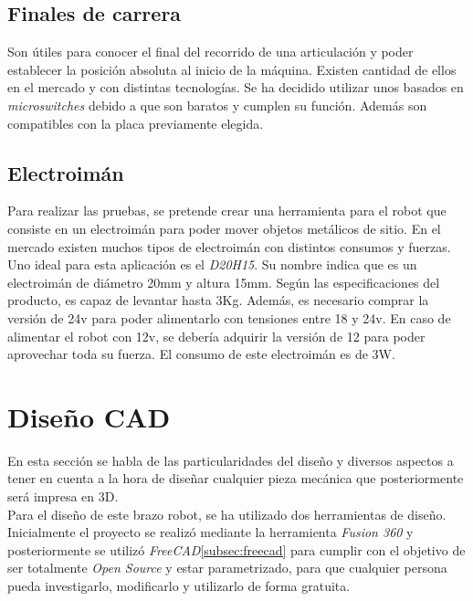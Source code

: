 \subsection{Finales de carrera}
Son útiles para conocer el final del recorrido de una articulación y poder establecer la posición absoluta al inicio de la 
máquina. 
Existen cantidad de ellos en el mercado y con distintas tecnologías. Se ha decidido utilizar unos basados en \textit{microswitches} debido a 
que son baratos y cumplen su función. Además son compatibles con la placa previamente elegida. 
\subsection{Electroimán}
Para realizar las pruebas, se pretende crear una herramienta para el robot que consiste en un electroimán para poder mover objetos metálicos 
de sitio. En el mercado existen muchos tipos de electroimán con distintos consumos y fuerzas. Uno ideal para esta aplicación es el \textit{D20H15}.
Su nombre indica que es un electroimán de diámetro 20mm y altura 15mm. Según las especificaciones del producto, es capaz de levantar hasta 3Kg. 
Además, es necesario comprar la versión de 24v para poder alimentarlo con tensiones entre 18 y 24v. En caso de alimentar el robot con 12v, se debería 
adquirir la versión de 12 para poder aprovechar toda su fuerza. El consumo de este electroimán es de 3W.
\newpage
\section{Diseño CAD}
\noindent En esta sección se habla de las particularidades del diseño y diversos aspectos a tener en cuenta a la hora de diseñar 
cualquier pieza mecánica que posteriormente será impresa en 3D. 
\\
Para el diseño de este brazo robot, se ha utilizado dos herramientas de diseño. Inicialmente el proyecto se realizó mediante 
la herramienta \textit{Fusion 360} y posteriormente se utilizó \textit{FreeCAD}\ref{subsec:freecad} para cumplir con el objetivo de ser totalmente 
\textit{Open Source} y estar parametrizado, para que cualquier persona pueda investigarlo, modificarlo y utilizarlo de forma gratuita.

